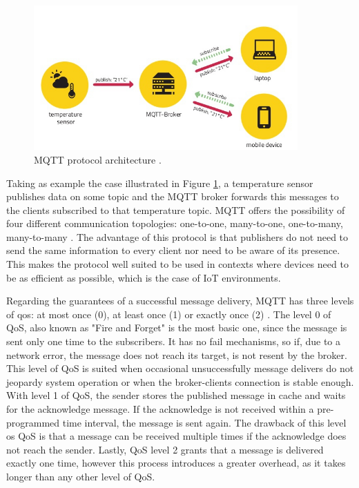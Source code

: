 \begin{figure}[H]
	\centering
	\includegraphics[width=0.9\textwidth]{figures/mqtt.jpg}
	\caption{MQTT protocol architecture \cite{Turan}.}
	\label{fig:mqtt}
\end{figure}

Taking as example the case illustrated in Figure \ref{fig:mqtt}, a temperature sensor publishes data on some topic and the MQTT broker forwards this messages to the clients subscribed to that temperature topic. MQTT offers the possibility of four different communication topologies: one-to-one, many-to-one, one-to-many, many-to-many \cite{Chen2016}. The advantage of this protocol is that publishers do not need to send the same information to every client nor need to be aware of its presence. This makes the protocol well suited to be used in contexts where devices need to be as efficient as possible, which is the case of IoT environments.

Regarding the guarantees of a successful message delivery, MQTT has three levels of \acf{qos}: at most once (0), at least once (1) or exactly once (2) \cite{mqtt_qos}. The level 0 of QoS, also known as "Fire and Forget" is the most basic one, since the message is sent only one time to the subscribers. It has no fail mechanisms, so if, due to a network error, the message does not reach its target, is not resent by the broker. This level of QoS is suited when occasional unsuccessfully message delivers do not jeopardy system operation or when the broker-clients connection is stable enough. With level 1 of QoS, the sender stores the published message in cache and waits for the acknowledge message. If the acknowledge is not received within a pre-programmed time interval, the message is sent again. The drawback of this level os QoS is that a message can be received multiple times if the acknowledge does not reach the sender. Lastly, QoS level 2 grants that a message is delivered exactly one time, however this process introduces a greater overhead, as it takes longer than any other level of QoS.

